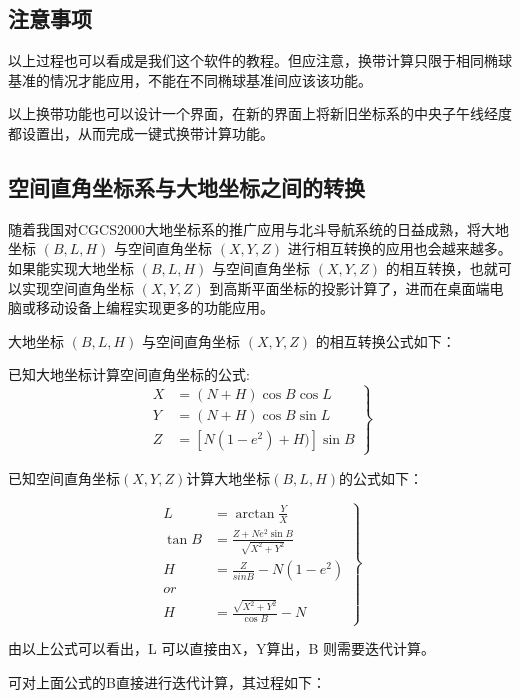 \subsection{注意事项}

以上过程也可以看成是我们这个软件的教程。但应注意，换带计算只限于相同椭球
基准的情况才能应用，不能在不同椭球基准间应该该功能。

以上换带功能也可以设计一个界面，在新的界面上将新旧坐标系的中央子午线经度
都设置出，从而完成一键式换带计算功能。

\subsection{空间直角坐标系与大地坐标之间的转换}

随着我国对CGCS2000大地坐标系的推广应用与北斗导航系统的日益成熟，将大地坐标 $(B, L, H)$
与空间直角坐标 $(X, Y, Z)$ 进行相互转换的应用也会越来越多。如果能实现大地坐标 $(B, L, H)$
与空间直角坐标 $(X, Y, Z)$ 的相互转换，也就可以实现空间直角坐标 $(X, Y, Z)$
到高斯平面坐标的投影计算了，进而在桌面端电脑或移动设备上编程实现更多的功能应用。

大地坐标 $(B, L, H)$ 与空间直角坐标 $(X, Y, Z)$ 的相互转换公式如下：

已知大地坐标计算空间直角坐标的公式:
\begin{equation}
\left .
\begin{aligned}
X &= (N+H) \cos B \cos L \\
Y &= (N+H) \cos B \sin L \\
Z &= [N(1 - e^2) + H)] \sin B 
\end{aligned} 
\right \}
\end{equation}

已知空间直角坐标$(X,Y,Z)$计算大地坐标$(B, L, H)$的公式如下：

\begin{equation}
\left . 
\begin{aligned}
L &= \arctan \frac{Y}{X} \\
\tan B &= \frac{Z + Ne^2 \sin B}{\sqrt{X^2 + Y^2}} \\
H &= \frac{Z}{sinB} - N(1-e^2)  \\
 or  \\
H &=\frac{\sqrt{X^2 + Y^2}}{\cos B} - N 
\end{aligned} 
\right \}
\end{equation}

由以上公式可以看出，L 可以直接由X，Y算出，B 则需要迭代计算。

可对上面公式的B直接进行迭代计算，其过程如下：

